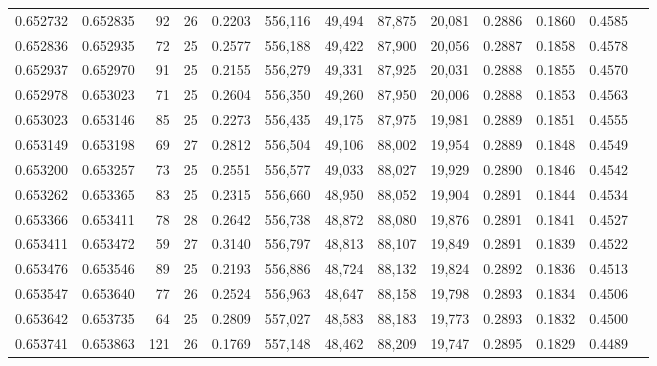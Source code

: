 \begin{tabular}{rrrrrrrrrrrrr}
0.652732 & 0.652835 &  92 &  26 &                                     0.2203 & 556,116 &  49,494 &  87,875 &  20,081 & 0.2886 & 0.1860 & 0.4585 \\
0.652836 & 0.652935 &  72 &  25 &                                     0.2577 & 556,188 &  49,422 &  87,900 &  20,056 & 0.2887 & 0.1858 & 0.4578 \\
0.652937 & 0.652970 &  91 &  25 &                                     0.2155 & 556,279 &  49,331 &  87,925 &  20,031 & 0.2888 & 0.1855 & 0.4570 \\
0.652978 & 0.653023 &  71 &  25 &                                     0.2604 & 556,350 &  49,260 &  87,950 &  20,006 & 0.2888 & 0.1853 & 0.4563 \\
0.653023 & 0.653146 &  85 &  25 &                                     0.2273 & 556,435 &  49,175 &  87,975 &  19,981 & 0.2889 & 0.1851 & 0.4555 \\
0.653149 & 0.653198 &  69 &  27 &                                     0.2812 & 556,504 &  49,106 &  88,002 &  19,954 & 0.2889 & 0.1848 & 0.4549 \\
0.653200 & 0.653257 &  73 &  25 &                                     0.2551 & 556,577 &  49,033 &  88,027 &  19,929 & 0.2890 & 0.1846 & 0.4542 \\
0.653262 & 0.653365 &  83 &  25 &                                     0.2315 & 556,660 &  48,950 &  88,052 &  19,904 & 0.2891 & 0.1844 & 0.4534 \\
0.653366 & 0.653411 &  78 &  28 &                                     0.2642 & 556,738 &  48,872 &  88,080 &  19,876 & 0.2891 & 0.1841 & 0.4527 \\
0.653411 & 0.653472 &  59 &  27 &                                     0.3140 & 556,797 &  48,813 &  88,107 &  19,849 & 0.2891 & 0.1839 & 0.4522 \\
0.653476 & 0.653546 &  89 &  25 &                                     0.2193 & 556,886 &  48,724 &  88,132 &  19,824 & 0.2892 & 0.1836 & 0.4513 \\
0.653547 & 0.653640 &  77 &  26 &                                     0.2524 & 556,963 &  48,647 &  88,158 &  19,798 & 0.2893 & 0.1834 & 0.4506 \\
0.653642 & 0.653735 &  64 &  25 &                                     0.2809 & 557,027 &  48,583 &  88,183 &  19,773 & 0.2893 & 0.1832 & 0.4500 \\
0.653741 & 0.653863 & 121 &  26 &                                     0.1769 & 557,148 &  48,462 &  88,209 &  19,747 & 0.2895 & 0.1829 & 0.4489 \\

\end{tabular}
